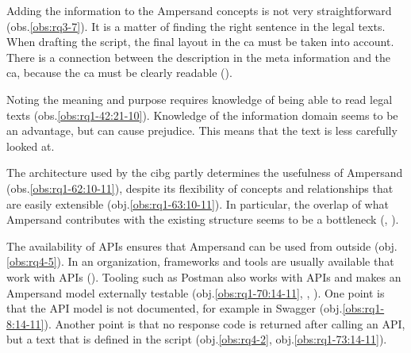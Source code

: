 Adding the information to the Ampersand concepts is not very straightforward (obs.\ref{obs:rq3-7}).
It is a matter of finding the right sentence in the legal texts.
When drafting the script, the final layout in the \acrlong{ca} must be taken into account.
There is a connection between the description in the meta information and the \acrlong{ca}, because the \acrlong{ca} must be clearly readable ().
\label{s:1_6_deviation}

Noting the meaning and purpose requires knowledge of being able to read legal texts (obs.\ref{obs:rq1-42:21-10}).
Knowledge of the information domain seems to be an advantage, but can cause prejudice.
This means that the text is less carefully looked at.
\label{s:1_7_architecture_and_registerkern}

The architecture used by the \acrshort{cibg} partly determines the usefulness of Ampersand (obs.\ref{obs:rq1-62:10-11}), despite its flexibility of concepts and relationships that are easily extensible (obj.\ref{obs:rq1-63:10-11}).
In particular, the overlap of what Ampersand contributes with the existing structure seems to be a bottleneck (, ).
\label{s:1_8_api}

The availability of APIs ensures that Ampersand can be used from outside (obj.\ref{obs:rq4-5}).
In an organization, frameworks and tools are usually available that work with APIs ().
Tooling such as Postman also works with APIs and makes an Ampersand model externally testable (obj.\ref{obs:rq1-70:14-11}, , ).
One point is that the API model is not documented, for example in Swagger (obj.\ref{obs:rq1-8:14-11}).
Another point is that no response code is returned after calling an API, but a text that is defined in the script (obj.\ref{obs:rq4-2}, obj.\ref{obs:rq1-73:14-11}).
\label{s:1_9_model_maintenance}

